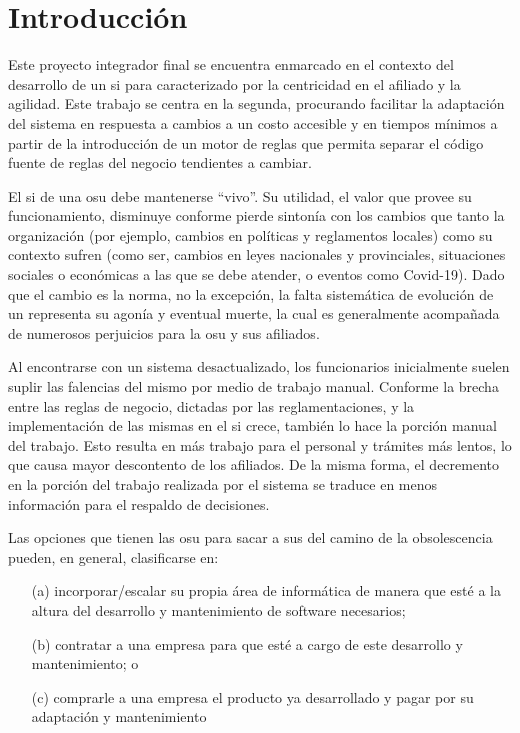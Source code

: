 \section{Introducción}

Este proyecto integrador final se encuentra enmarcado en el contexto del desarrollo de un \acrfull{si} para  caracterizado por la centricidad en el afiliado y la agilidad. Este trabajo se centra en la segunda, procurando facilitar la adaptación del sistema en respuesta a cambios a un costo accesible y en tiempos mínimos a partir de la introducción de un motor de reglas que permita separar el código fuente de reglas del negocio tendientes a cambiar.

El \acrshort{si} de una \acrshort{osu} debe mantenerse ``vivo''. 
Su utilidad, el valor que provee su funcionamiento, disminuye conforme pierde sintonía con los cambios que tanto la organización (por ejemplo, cambios en políticas y reglamentos locales) como su contexto sufren (como ser, cambios en leyes nacionales y provinciales, situaciones sociales o económicas a las que se debe atender, o eventos como Covid-19).
Dado que el cambio es la norma, no la excepción, la falta sistemática de evolución de un {\SIOSU} representa su agonía y eventual muerte, la cual es generalmente acompañada de numerosos perjuicios para la \acrshort{osu} y sus afiliados.

Al encontrarse con un sistema desactualizado, los funcionarios inicialmente suelen suplir las falencias del mismo por medio de trabajo manual. Conforme la brecha entre las reglas de negocio, dictadas por las reglamentaciones, y la implementación de las mismas en el \acrshort{si} crece, también lo hace la porción manual del trabajo. Esto resulta en más trabajo para el personal y trámites más lentos, lo que causa mayor descontento de los afiliados. De la misma forma, el decremento en la porción del trabajo realizada por el sistema se traduce en menos información para el respaldo de decisiones.

Las opciones que tienen las \acrshort{osu} para sacar a sus  del camino de la obsolescencia pueden, en general, clasificarse en:

\begin{enumerate}
    \item [(a)] incorporar/escalar su propia área de informática de manera que esté a la altura del desarrollo y mantenimiento de software necesarios;
    \item [(b)] contratar a una empresa para que esté a cargo de este desarrollo y mantenimiento; o
    \item [(c)] comprarle a una empresa el producto ya desarrollado y pagar por su adaptación y mantenimiento 
\end{enumerate} 

